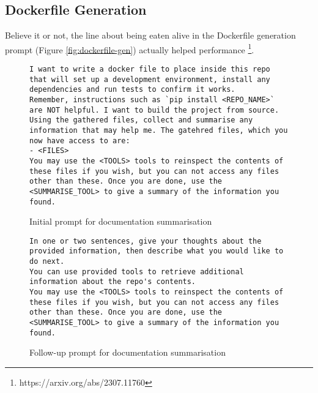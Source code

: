 \documentclass[conference]{IEEEtran}
\begin{document}
\clearpage
\subsection{Dockerfile Generation}
Believe it or not, the line about being eaten alive in the Dockerfile generation prompt (Figure \ref{fig:dockerfile-gen}) actually helped performance \footnote{https://arxiv.org/abs/2307.11760}.
\begin{figure}[h!]
    \begin{lstlisting}
I want to write a docker file to place inside this repo that will set up a development environment, install any dependencies and run tests to confirm it works.
Remember, instructions such as `pip install <REPO_NAME>` are NOT helpful. I want to build the project from source.
Using the gathered files, collect and summarise any information that may help me. The gatehred files, which you now have access to are:
- <FILES>
You may use the <TOOLS> tools to reinspect the contents of these files if you wish, but you can not access any files other than these. Once you are done, use the <SUMMARISE_TOOL> to give a summary of the information you found.
    \end{lstlisting}
    \caption{Initial prompt for documentation summarisation}
\end{figure}
\begin{figure}[h!]
    \begin{lstlisting}
In one or two sentences, give your thoughts about the provided information, then describe what you would like to do next.
You can use provided tools to retrieve additional information about the repo's contents.
You may use the <TOOLS> tools to reinspect the contents of these files if you wish, but you can not access any files other than these. Once you are done, use the <SUMMARISE_TOOL> to give a summary of the information you found.
    \end{lstlisting}
    \caption{Follow-up prompt for documentation summarisation}
\end{figure}
\end{document}
